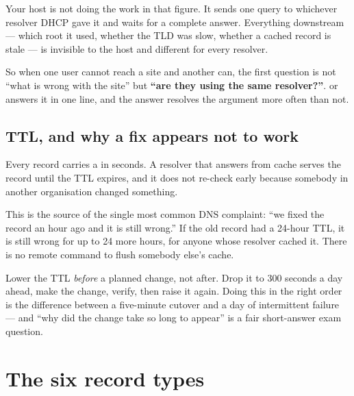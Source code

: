 \begin{conceptbox}
Your host is not doing the work in that figure. It sends one query to whichever
resolver DHCP gave it and waits for a complete answer. Everything downstream ---
which root it used, whether the TLD was slow, whether a cached record is
stale --- is invisible to the host and different for every resolver.

So when one user cannot reach a site and another can, the first question is not
``what is wrong with the site'' but \textbf{``are they using the same
resolver?''}.  or  answers it in one
line, and the answer resolves the argument more often than not.
\end{conceptbox}

\subsection{TTL, and why a fix appears not to work}

Every record carries a  in seconds. A resolver that answers
from cache serves the record until the TTL expires, and it does not re-check
early because somebody in another organisation changed something.

This is the source of the single most common DNS complaint: ``we fixed the record
an hour ago and it is still wrong.'' If the old record had a 24-hour TTL, it is
still wrong for up to 24 more hours, for anyone whose resolver cached it. There
is no remote command to flush somebody else's cache.

\begin{alertbox}
Lower the TTL \emph{before} a planned change, not after. Drop it to 300 seconds a
day ahead, make the change, verify, then raise it again. Doing this in the right
order is the difference between a five-minute cutover and a day of intermittent
failure --- and ``why did the change take so long to appear'' is a fair short-answer
exam question.
\end{alertbox}

\section{The six record types}

